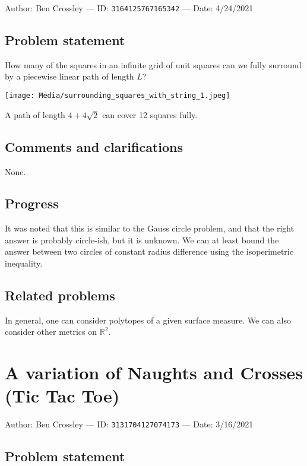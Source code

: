 \documentclass[10pt]{article}
\begin{document}
Author: Ben Crossley --- ID: \verb`3164125767165342` --- Date: 4/24/2021

\subsection{Problem statement}

How many of the squares in an infinite grid of unit squares can we fully surround by a piecewise linear path of length $L$?

\BlankLine
\BlankLine

\texttt{[image: Media/surrounding\_squares\_with\_string\_1.jpeg]}

A path of length $4+4\sqrt2$ can cover 12 squares fully.

\subsection{Comments and clarifications}

None.

\subsection{Progress}

It was noted that this is similar to the Gauss circle problem, and that the right answer is probably circle-ish, but it is unknown. We can at least bound the answer between two circles of constant radius difference using the isoperimetric inequality.

\subsection{Related problems}

In general, one can consider polytopes of a given surface measure. We can also consider other metrics on $\mathbb{R}^2$.

\pagebreak

\section{A variation of Naughts and Crosses (Tic Tac Toe)}

Author: Ben Crossley --- ID: \verb`3131704127074173` --- Date: 3/16/2021

\subsection{Problem statement}
\end{document}
